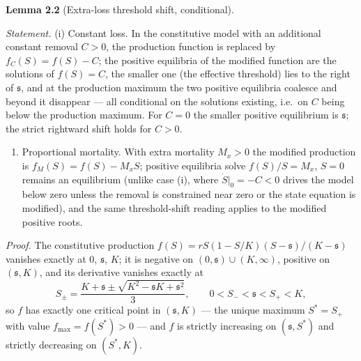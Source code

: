 \documentclass[11pt]{article}
\providecommand{\tightlist}{\setlength{\itemsep}{0pt}\setlength{\parskip}{0pt}}
\begin{document}
\textbf{Lemma 2.2} (Extra-loss threshold shift, conditional).

\emph{Statement.} (i) Constant loss. In the constitutive model with an
additional constant removal \(C>0\), the production function is replaced
by \(f_C(S)=f(S)-C\); the positive equilibria of the modified function
are the solutions of \(f(S)=C\), the smaller one (the effective
threshold) lies to the right of \(\mathfrak s\), and at the production
maximum the two positive equilibria coalesce and beyond it disappear ---
all conditional on the solutions existing, i.e.~on \(C\) being below the
production maximum. For \(C=0\) the smaller positive equilibrium is \(\mathfrak s\); the strict rightward shift holds for \(C>0\).

\begin{enumerate}
\def\labelenumi{(\roman{enumi})}
\setcounter{enumi}{1}
\tightlist
\item
  Proportional mortality. With extra mortality \(M_x>0\) the modified
  production is \(f_M(S)=f(S)-M_xS\); positive equilibria solve
  \(f(S)/S=M_x\), \(S=0\) remains an equilibrium (unlike case (i), where
  \(\dot S|_0=-C<0\) drives the model below zero unless the removal is
  constrained near zero or the state equation is modified), and the same
  threshold-shift reading applies to the modified positive roots.
\end{enumerate}

\emph{Proof.} The constitutive production
\(f(S) = rS(1-S/K)(S-\mathfrak s)/(K-\mathfrak s)\) vanishes exactly at
\(0\), \(\mathfrak s\), \(K\); it is negative on
\((0,\mathfrak s)\cup(K,\infty)\), positive on \((\mathfrak s,K)\), and
its derivative vanishes exactly at
\[S_{\pm} = \frac{K+\mathfrak s \pm \sqrt{K^2-\mathfrak s K+\mathfrak s^2}}{3}, \qquad 0 < S_- < \mathfrak s < S_+ < K,\]
so \(f\) has exactly one critical point in \((\mathfrak s,K)\) --- the
unique maximum \(S^* = S_+\) with value \(f_{\max} = f(S^*) > 0\) ---
and \(f\) is strictly increasing on \((\mathfrak s,S^*)\) and strictly
decreasing on \((S^*,K)\).
\end{document}
